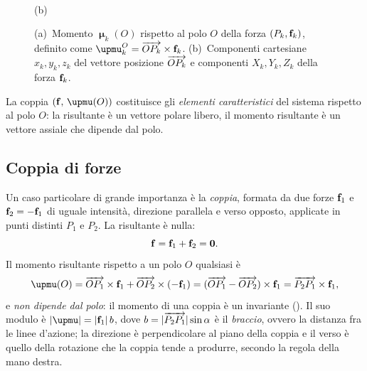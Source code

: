 \begin{figure}[!htbp]
\begin{minipage}[b]{0.50\textwidth}
		\\[0.8ex]
		(b)
	\end{minipage}
	\caption{(a)~Momento $\bm{\upmu}_k(O)$ rispetto al polo
		$O$ della forza $(P_k,\mathbf{f}_k)$, definito come
		$\bm{\upmu}^O_k = \protect\overrightarrow{OP_k}\times\fb_k$.
		(b)~Componenti cartesiane $x_k,y_k,z_k$ del vettore
		posizione $\protect\overrightarrow{OP_k}$ e componenti
		$X_k,Y_k,Z_k$ della forza $\mathbf{f}_k$.}
	\label{fig:momento_forza}
\end{figure}

La coppia $(\fb,\,\bm{\upmu}(O))$ costituisce gli
\textit{elementi caratteristici} del sistema rispetto al
polo $O$: la risultante è un vettore polare libero,
il momento risultante è un vettore assiale che dipende
dal polo.


\subsection{Coppia di forze}

Un caso particolare di grande importanza è la \textit{coppia},
formata da due forze $\mathbf{f}_1$ e $\mathbf{f}_2 = -\mathbf{f}_1$ di uguale
intensità, direzione parallela e verso opposto, applicate in
punti distinti $P_1$ e $P_2$. La risultante è nulla:
\begin{equation}
	\mathbf{f} = \mathbf{f}_1 + \mathbf{f}_2 = \mathbf{0}.
\end{equation}
Il momento risultante rispetto a un polo $O$ qualsiasi è
\begin{equation}\label{eq:coppia}
	\bm{\upmu}(O)
	= \overrightarrow{OP_1} \times \fb_1
	+ \overrightarrow{OP_2} \times (-\fb_1)
	= (\overrightarrow{OP_1} - \overrightarrow{OP_2})
	\times \fb_1
	= \overrightarrow{P_2P_1} \times \fb_1,
\end{equation}
e \textit{non dipende dal polo}: il momento di una coppia è
un invariante (). Il suo modulo è
$|\bm{\upmu}| = |\fb_1|\,b$, dove
$b = |\protect\overrightarrow{P_2P_1}|\sin\alpha$ è il
\textit{braccio}, ovvero la distanza fra le linee d'azione;
la direzione è perpendicolare al piano della coppia e il verso
è quello della rotazione che la coppia tende a produrre,
secondo la regola della mano destra.



